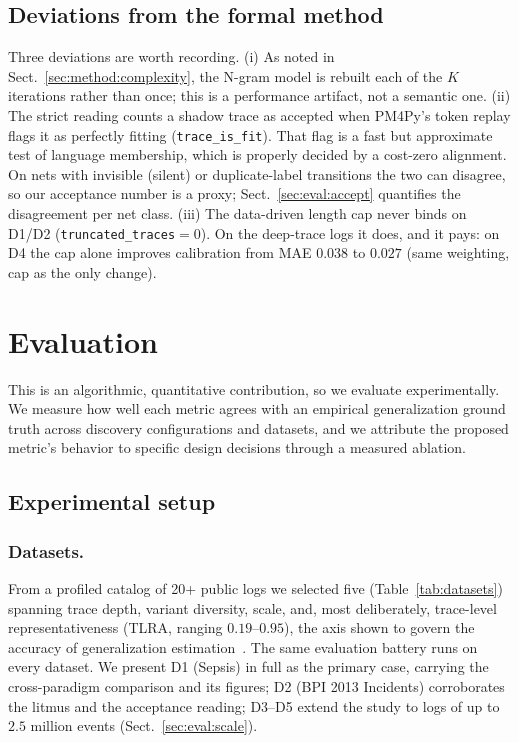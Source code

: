 \documentclass[runningheads]{llncs}
\newcommand{\chg}[1]{\textcolor{chgblue}{#1}}
\begin{document}
\subsection{Deviations from the formal method}
\label{sec:impl:deviations}
Three deviations are worth recording. (i) As noted in Sect.~\ref{sec:method:complexity}, the N-gram model is rebuilt each of the $K$ iterations rather than once; this is a performance artifact, not a semantic one. (ii) The strict reading counts a shadow trace as accepted when PM4Py's token replay flags it as perfectly fitting (\texttt{trace\_is\_fit}). That flag is a fast but approximate test of language membership, which is properly decided by a cost-zero alignment. On nets with invisible (silent) or duplicate-label transitions the two can disagree, so our acceptance number is a proxy\chg{; Sect.~\ref{sec:eval:accept} quantifies the disagreement per net class}. (iii) \chg{The data-driven length cap never binds on D1/D2 (\texttt{truncated\_traces}${=}0$). On the deep-trace logs it does, and it pays: on D4 the cap alone improves calibration from MAE $0.038$ to $0.027$ (same weighting, cap as the only change).}

\section{Evaluation}
\label{sec:eval}
This is an algorithmic, quantitative contribution, so we evaluate experimentally. We measure how well each metric agrees with an empirical generalization ground truth across discovery configurations and datasets, and we attribute the proposed metric's behavior to specific design decisions through \chg{a measured ablation}.

\subsection{Experimental setup}
\label{sec:eval:setup}

\subsubsection{Datasets.}
From a profiled catalog of 20+ public logs we selected five (Table~\ref{tab:datasets}) spanning trace depth, variant diversity, scale, and, most deliberately, trace-level representativeness (TLRA, ranging $0.19$--$0.95$), the axis shown to govern the accuracy of generalization estimation~\cite{karunaratne2024representativeness}. The same evaluation battery runs on every dataset. We present D1 (Sepsis) in full as the primary case, carrying the cross-paradigm comparison and its figures; D2 (BPI 2013 Incidents) corroborates the litmus and the acceptance reading\chg{; D3--D5 extend the study to logs of up to $2.5$ million events (Sect.~\ref{sec:eval:scale})}.
\end{document}
